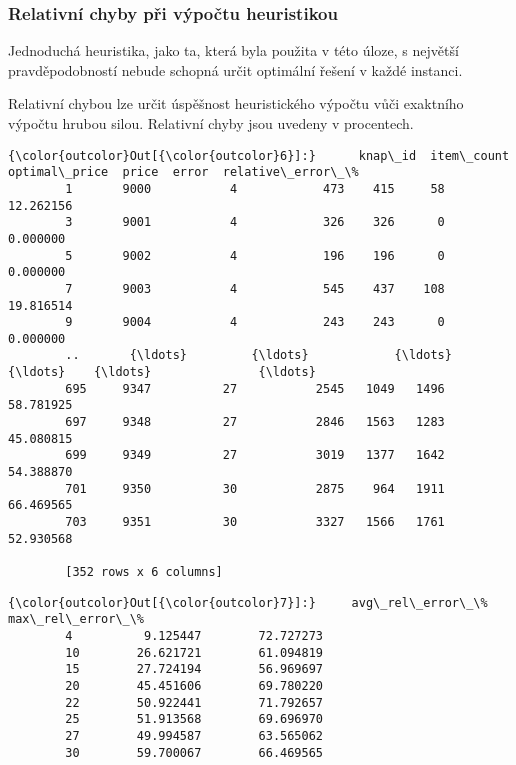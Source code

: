 \documentclass[11pt]{article}
\begin{document}
    \subsubsection{Relativní chyby při výpočtu
heuristikou}\label{relativnuxed-chyby-pux159i-vuxfdpoux10dtu-heuristikou}

Jednoduchá heuristika, jako ta, která byla použita v této úloze, s
největší pravděpodobností nebude schopná určit optimální řešení v každé
instanci.

Relativní chybou lze určit úspěšnost heuristického výpočtu vůči
exaktního výpočtu hrubou silou. Relativní chyby jsou uvedeny v
procentech.


\begin{Verbatim}[commandchars=\\\{\}]
{\color{outcolor}Out[{\color{outcolor}6}]:}      knap\_id  item\_count  optimal\_price  price  error  relative\_error\_\%
        1       9000           4            473    415     58         12.262156
        3       9001           4            326    326      0          0.000000
        5       9002           4            196    196      0          0.000000
        7       9003           4            545    437    108         19.816514
        9       9004           4            243    243      0          0.000000
        ..       {\ldots}         {\ldots}            {\ldots}    {\ldots}    {\ldots}               {\ldots}
        695     9347          27           2545   1049   1496         58.781925
        697     9348          27           2846   1563   1283         45.080815
        699     9349          27           3019   1377   1642         54.388870
        701     9350          30           2875    964   1911         66.469565
        703     9351          30           3327   1566   1761         52.930568
        
        [352 rows x 6 columns]
\end{Verbatim}


\newpage

            
\begin{Verbatim}[commandchars=\\\{\}]
{\color{outcolor}Out[{\color{outcolor}7}]:}     avg\_rel\_error\_\%  max\_rel\_error\_\%
        4          9.125447        72.727273
        10        26.621721        61.094819
        15        27.724194        56.969697
        20        45.451606        69.780220
        22        50.922441        71.792657
        25        51.913568        69.696970
        27        49.994587        63.565062
        30        59.700067        66.469565
\end{Verbatim}
      
\end{document}
